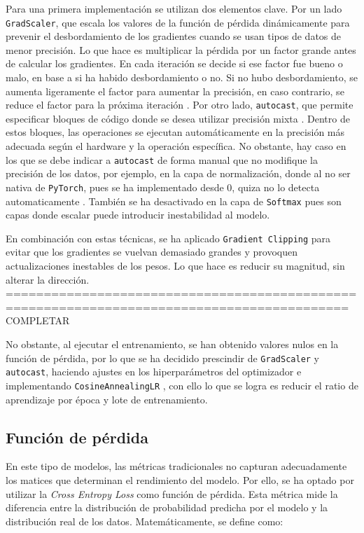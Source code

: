 \documentclass[11pt]{book}
\theoremstyle{plain}
\theoremstyle{definition}
\begin{document}
Para una primera implementación se utilizan dos elementos clave. Por un lado \texttt{GradScaler}, que escala los valores de la función de pérdida dinámicamente para prevenir el desbordamiento de los gradientes cuando se usan tipos de datos de menor precisión. Lo que hace es multiplicar la pérdida por un factor grande antes de calcular los gradientes. En cada iteración se decide si ese factor fue bueno o malo, en base a si ha habido desbordamiento o no. Si no hubo desbordamiento, se aumenta ligeramente el factor para aumentar la precisión, en caso contrario, se reduce el factor para la próxima iteración \parencite{amit2024mixedprecision}. Por otro lado, \texttt{autocast}, que permite especificar bloques de código donde se desea utilizar precisión mixta \parencite{stack_overflow_gradscaler}. Dentro de estos bloques, las operaciones se ejecutan automáticamente en la precisión más adecuada según el hardware y la operación específica. No obstante, hay caso en los que se debe indicar a \texttt{autocast} de forma manual que no modifique la precisión de los datos, por ejemplo, en la capa de normalización, donde al no ser nativa de \texttt{PyTorch}, pues se ha implementado desde 0, quiza no lo detecta automaticamente \parencite{amit2024mixedprecision}. También se ha desactivado en la capa de \texttt{Softmax} pues son capas donde escalar puede introducir inestabilidad al modelo.

En combinación con estas técnicas, se ha aplicado \texttt{Gradient Clipping} para evitar que los gradientes se vuelvan demasiado grandes y provoquen actualizaciones inestables de los pesos. Lo que hace es reducir su magnitud, sin alterar la dirección. 
===========================================================================================
COMPLETAR

No obstante, al ejecutar el entrenamiento, se han obtenido valores nulos en la función de pérdida, por lo que se ha decidido prescindir de \texttt{GradScaler} y \texttt{autocast}, haciendo ajustes en los hiperparámetros del optimizador e implementando \texttt{CosineAnnealingLR} \parencite{pytorch_cosineannealinglr}, con ello lo que se logra es reducir el ratio de aprendizaje por época y lote de entrenamiento. 

\subsection{Función de pérdida}

En este tipo de modelos, las métricas tradicionales no capturan adecuadamente los matices que determinan el rendimiento del modelo. Por ello, se ha optado por utilizar la \textit{Cross Entropy Loss} como función de pérdida. Esta métrica mide la diferencia entre la distribución de probabilidad predicha por el modelo y la distribución real de los datos. 
Matemáticamente, se define como:
\end{document}
